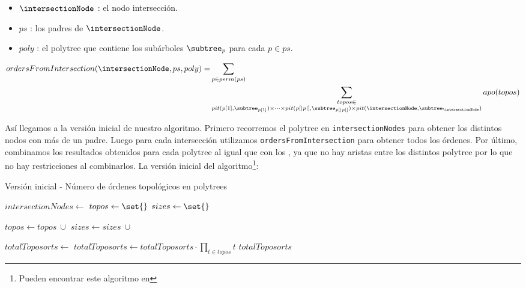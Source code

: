 \begin{itemize}
    \item $\intersectionNode$ : el nodo intersección.
    \item $ps$ : los padres de $\intersectionNode$. 
    \item $poly$ : el polytree que contiene los subárboles $\subtree_p$ para cada $p \in ps$. 
\end{itemize}

\begin{align}\label{formula:combineMultipleParents} 
    ordersFromIntersection(\intersectionNode, ps, poly) =&
    \sum_{p \in perm(ps)} \\& \nonumber
    \sum_{\substack{
    topos \in \\
    pit(p[1], \subtree_{p[1]}) \times \cdots \times pit(p[|p|], \subtree_{p[|p|]}) \times pit(\intersectionNode, \subtree_{\intersectionNode})
}}  apo(topos)
\end{align}

Así llegamos a la versión inicial de nuestro algoritmo. Primero recorremos el polytree en \newline \texttt{intersectionNodes} para obtener los distintos nodos con más de un padre. Luego para cada intersección utilizamos \newline \texttt{ordersFromIntersection} para obtener todos los órdenes. Por último, combinamos los resultados obtenidos para cada polytree al igual que con los \dtrees{}, ya que no hay aristas entre los distintos polytree por lo que no hay restricciones al combinarlos. La versión inicial del algoritmo\footnote{Pueden encontrar este algoritmo en }: 

\begin{algorithm}
\caption{Versión inicial - Número de órdenes topológicos en polytrees} \label{alg:numberToposortsPolytreeFailed}
\begin{algorithmic}[1]
    \State $intersectionNodes \gets$ 
    \State $topos \gets \set{}$
    \State $sizes \gets \set{}$

        \State $topos \gets topos \ \cup $ 
        \State $sizes \gets sizes \ \cup$ 
    \EndFor

    \State $totalToposorts \gets$ 
    \State $totalToposorts \gets totalToposorts \cdot \prod_{t \in topos} t$
    \State \Return $totalToposorts$
\EndFunction
\end{algorithmic}
\end{algorithm}


